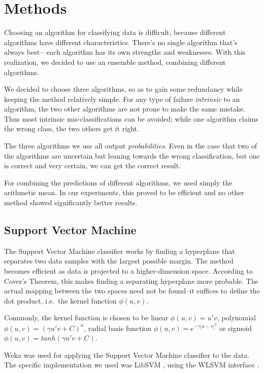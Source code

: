 \section{Methods}

Choosing an algorithm for classifying data is difficult, because
different algorithms have different characteristics. There's no single
algorithm that's always best---each algorithm has its own strengths and
weaknesses. With this realization, we decided to use an ensemble method,
combining different algorithms.

We decided to choose three algorithms, so as to gain some redundancy
while keeping the method relatively simple. For any type of failure
\emph{intrinsic} to an algorithm, the two other algorithms are not prone
to make the same mistake. Thus most intrinsic mis-classifications can be
avoided; while one algorithm claims the wrong class, the two others get
it right.

The three algorithms we use all output \emph{probabilities}. Even in the
case that two of the algorithms are uncertain but leaning towards the
wrong classification, but one is correct and very certain, we can get
the correct result.

For combining the predictions of different algorithms, we used simply
the arithmetic mean. In our experiments, this proved to be efficient and
no other method showed significantly better results.

\subsection{Support Vector Machine}

The Support Vector Machine classifier works by finding a hyperplane that
separates two data samples with the largest possible margin. The method
becomes efficient as data is projected to a higher-dimension space.
According to Cover's Theorem, this makes finding a separating hyperplane
more probable. The actual mapping between the two spaces need not be
found--it suffices to define the dot product, i.e.~the kernel function
$\phi(u,v)$. \cite{cortes1995support}

Commonly, the kernel function is chosen to be linear $\phi(u,v) = u' v$,
polynomial $\phi(u,v) = (\gamma u' v + C)^n$, radial basis function
$\phi(u,v) = e^{-\gamma |u-v|^2}$ or sigmoid
$\phi(u,v) = tanh(\gamma u' v + C)$.

Weka \cite{weka} was used for applying the Support Vector Machine
classifier to the data. The specific implementation we used was LibSVM
\cite{libsvm}, using the WLSVM interface \cite{wlsvm}.

